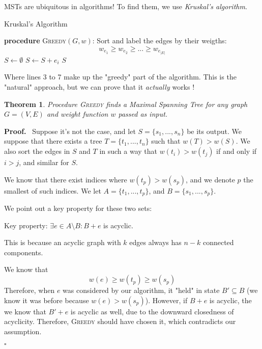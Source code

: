 \documentclass{report}
\newcommand{\aparte}[2]{
    \vspace{0.5em}
    \begin{adjustwidth}{20pt}{0pt}
        \begin{boxxx}
            \textbf{#1.}\ #2
        \end{boxxx}
    \end{adjustwidth}
    \vspace{0.75em}
}
\newcommand{\takes}{\ensuremath{\leftarrow}}
\newtheorem{theorem}{Theorem}
\begin{document}
  MSTs are ubiquitous in algorithms! To find them, we use \emph{Kruskal's algorithm}.

	\begin{center}
    \begin{minipage}{.9\linewidth}
      \begin{algorithm}[H]
        \caption{Kruskal's Algorithm}
        \label{Kruskal}
        \begin{algorithmic}[1]
          \item[] \textbf{procedure} \textsc{Greedy}$(G, w)$:
          \STATE Sort and label the edges by their weigths: \[w_{e_1} \geqslant w_{e_2} \geqslant ... \geqslant  w_{e_{|E|}}\]
          \STATE $S \takes \emptyset$
          \FOR{$i \takes 1 \text{ to } |E|$}
              \STATE $S \takes S + e_i$
            \ENDIF
          \ENDFOR
          \RETURN $S$
        \end{algorithmic}
      \end{algorithm}
    \end{minipage}
  \end{center}

  Where lines 3 to 7 make up the "greedy" part of the algorithm. This is the "natural" approach, but we can prove that it \textit{actually} works !

  \begin{theorem}
  	Procedure \textsc{Greedy} finds a Maximal Spanning Tree for any graph $G = (V, E)$ and weight function $w$ passed as input.
  \end{theorem}
  \aparte{Proof}{
    Suppose it's not the case, and let $S = \{s_1, ..., s_n\}$ be its output. We suppose that there exists a tree $T = \{t_1, ..., t_n\}$ such that $w(T) > w(S)$. We also sort the edges in $S$ and $T$ in such a way that $w(t_i) > w(t_j)$ if and only if $i > j$, and similar for $S$.

    We know that there exist indices where $w(t_p) > w(s_p)$, and we denote $p$ the smallest of such indices. We let $A = \{t_1, ..., t_p\}$, and $B = \{s_1, ..., s_p\}$.

    We point out a key property for these two sets:
    \begin{adjustwidth}{40pt}{0pt}
      Key property: $\exists e \in A \setminus B : B + e$ is acyclic.
    \end{adjustwidth}

    This is because an acyclic graph with $k$ edges always has $n - k$ connected components.

    We know that \[w(e) \geqslant w(t_p) \geqslant w(s_p)\] Therefore, when $e$ was considered by our algorithm, it "held" in state $B' \subseteq B$ (we know it was before because $w(e) > w(s_p)$). However, if $B + e$ is acyclic, the we know that $B' + e$ is acyclic as well, due to the downward closedness of acyclicity. Therefore, \textsc{Greedy} should have chosen it, which contradicts our assumption.

    \hfill \ensuremath{\square}
  }
\end{document}
